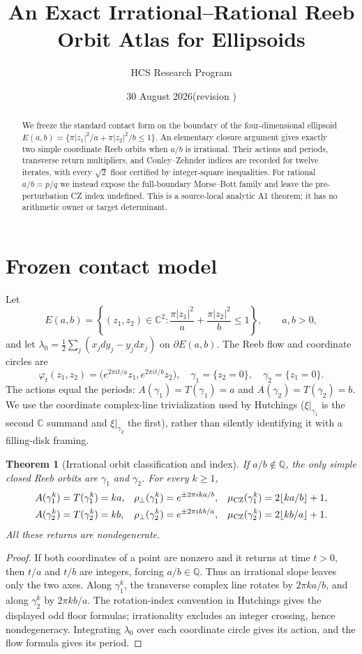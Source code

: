 \documentclass[10pt]{article}
\title{An Exact Irrational--Rational Reeb Orbit Atlas for Ellipsoids}
\author{HCS Research Program}
\date{30 August 2026\quad (revision \CRevisionRound)}
\newtheorem{theorem}{Theorem}
\begin{document}
\maketitle
\begin{abstract}
We freeze the standard contact form on the boundary of the four-dimensional
ellipsoid
\(E(a,b)=\{\pi|z_1|^2/a+\pi|z_2|^2/b\le1\}\).  An elementary closure
argument gives exactly two simple coordinate Reeb orbits when \(a/b\) is
irrational.  Their actions and periods, transverse return multipliers, and
Conley--Zehnder indices are recorded for twelve iterates, with every
\(\sqrt2\) floor certified by integer-square inequalities.  For rational
\(a/b=p/q\) we instead expose the full-boundary Morse--Bott family and leave
the pre-perturbation CZ index undefined.  This is a source-local analytic A1
theorem; it has no arithmetic owner or target determinant.
\end{abstract}

\section{Frozen contact model}
Let
\[
 E(a,b)=\left\{(z_1,z_2)\in\mathbb C^2:
 \frac{\pi|z_1|^2}{a}+\frac{\pi|z_2|^2}{b}\le1\right\},\qquad a,b>0,
\]
and let \(\lambda_0=\frac12\sum_j(x_jdy_j-y_jdx_j)\) on
\(\partial E(a,b)\).  The Reeb flow and coordinate circles are
\[
 \varphi_t(z_1,z_2)=\big(e^{2\pi it/a}z_1,e^{2\pi it/b}z_2\big),
 \quad \gamma_1=\{z_2=0\},\quad \gamma_2=\{z_1=0\}.
\]
The actions equal the periods: \(A(\gamma_1)=T(\gamma_1)=a\) and
\(A(\gamma_2)=T(\gamma_2)=b\).  We use the coordinate complex-line
trivialization used by Hutchings (\(\xi|_{\gamma_1}\) is the second
\(\mathbb C\) summand and \(\xi|_{\gamma_2}\) the first), rather than
silently identifying it with a filling-disk framing.

\begin{theorem}[Irrational orbit classification and index]
If \(a/b\notin\mathbb Q\), the only simple closed Reeb orbits are
\(\gamma_1\) and \(\gamma_2\).  For every \(k\ge1\),
\begin{align*}
 A(\gamma_1^k)=T(\gamma_1^k)&=ka,&
 \rho_\perp(\gamma_1^k)&=e^{\pm2\pi i k a/b},&
 \mu_{\rm CZ}(\gamma_1^k)&=2\lfloor ka/b\rfloor+1,\\
 A(\gamma_2^k)=T(\gamma_2^k)&=kb,&
 \rho_\perp(\gamma_2^k)&=e^{\pm2\pi i k b/a},&
 \mu_{\rm CZ}(\gamma_2^k)&=2\lfloor kb/a\rfloor+1.
\end{align*}
All these returns are nondegenerate.
\end{theorem}
\begin{proof}
If both coordinates of a point are nonzero and it returns at time \(t>0\),
then \(t/a\) and \(t/b\) are integers, forcing \(a/b\in\mathbb Q\).
Thus an irrational slope leaves only the two axes.  Along \(\gamma_1^k\),
the transverse complex line rotates by \(2\pi k a/b\), and along
\(\gamma_2^k\) by \(2\pi k b/a\).  The rotation-index convention in
Hutchings gives the displayed odd floor formulas; irrationality excludes an
integer crossing, hence nondegeneracy.  Integrating \(\lambda_0\) over each
coordinate circle gives its action, and the flow formula gives its period.
\end{proof}
\end{document}
